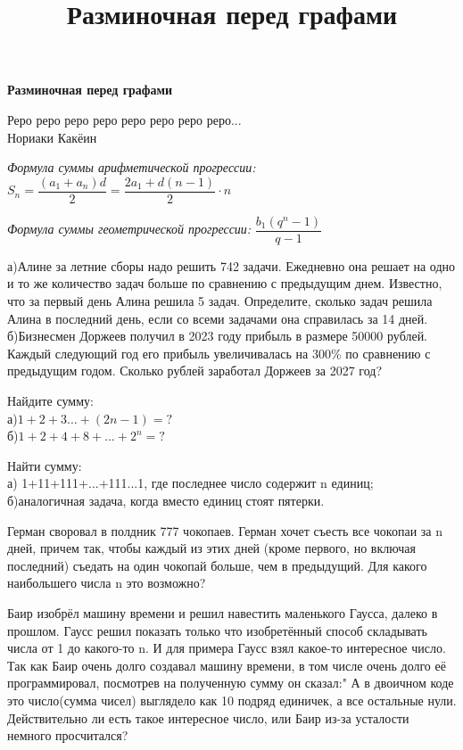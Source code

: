 \centerline{\bf \Huge Разминочная перед графами}
\title{Разминочная перед графами}

\begin{flushright}
    \scriptsize Реро реро реро реро реро реро реро реро...\\Нориаки Какёин
\end{flushright}

\textit{Формула суммы арифметической прогрессии:} $S_n=\dfrac{(a_1 + a_n)d}{2} = \dfrac{2a_1 + d(n-1)}{2}\cdot n$

\textit{Формула суммы геометрической прогрессии:} $\dfrac{b_1 (q^n-1)}{q-1}$
    
 а)Алине за летние сборы надо решить  742 задачи. Ежедневно она решает на одно и то же количество задач больше по сравнению с предыдущим днем. Известно, что за первый день Алина решила 5 задач. Определите, сколько задач решила Алина в последний день, если со всеми задачами она справилась за 14 дней.\\
б)Бизнесмен Доржеев получил в 2023 году прибыль в размере 50000 рублей. Каждый следующий год его прибыль увеличивалась на 300\% по сравнению с предыдущим годом. Сколько рублей заработал Доржеев за 2027 год?

Найдите сумму:\\
а)$1+2+3\dots+(2n-1)=?$\\
б)$1+2+4+8+\dots+2^n=?$

Найти сумму:\\
а) 1+11+111+...+111...1, где последнее число содержит n единиц; \\
б)аналогичная задача, когда вместо единиц стоят пятерки.

Герман своровал в полдник 777 чокопаев. Герман хочет съесть все чокопаи за n дней, причем так, чтобы каждый из этих дней (кроме первого, но включая последний) съедать на один чокопай больше, чем в предыдущий. Для какого наибольшего числа n это возможно?

Баир изобрёл машину времени и решил навестить маленького Гаусса, далеко в прошлом. Гаусс решил показать только что изобретённый способ складывать числа от 1 до какого-то n. И для примера Гаусс взял какое-то интересное число. Так как Баир очень долго создавал машину времени, в том числе очень долго её программировал, посмотрев на полученную сумму он сказал:" А в двоичном коде это число(сумма чисел) выглядело как 10 подряд единичек, а все остальные нули. Действительно ли есть такое интересное число, или Баир из-за усталости немного просчитался?


